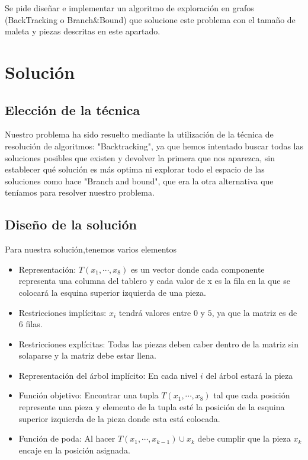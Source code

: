 \documentclass[a4paper, 11pt]{article}
\begin{document}
Se pide diseñar e implementar un algoritmo de exploración en grafos
(BackTracking o Branch\&Bound) que solucione este problema con el tamaño de maleta
y piezas descritas en este apartado.

\section{Solución}




\subsection{Elección de la técnica}
Nuestro problema ha sido resuelto mediante la utilización de la técnica de resolución de algoritmos: "Backtracking", ya que hemos intentado buscar todas las soluciones posibles que existen y devolver la primera que nos aparezca, sin establecer qué solución es más optima ni explorar todo el espacio de las soluciones como hace "Branch and bound", que era la otra alternativa que teníamos para resolver nuestro problema.

\subsection{Diseño de la solución}
Para nuestra solución,tenemos varios elementos
\begin{itemize}
	\item Representación: $T(x_1,\cdots,x_8)$ es un vector donde cada 
componente representa una columna del tablero y cada valor de x es la fila en la que se colocará la esquina superior izquierda de una pieza.
	\item Restricciones implícitas: $x_i$ tendrá valores entre $0$ y $5$, ya que la matriz es de $6$ filas.
	\item Restricciones explícitas: Todas las piezas deben caber dentro de la  matriz sin solaparse y la matriz debe estar llena.
	\item Representación del árbol implícito: En cada nivel $i$ del árbol estará la pieza
	\item Función objetivo: Encontrar una tupla $T(x_1,\cdots, x_8)$ tal que cada posición represente una pieza y elemento de la tupla esté la posición de la esquina superior izquierda de la pieza donde esta está colocada.
	\item Función de poda: Al hacer $T(x_1,\cdots,x_{k-1}) \cup x_k$ debe cumplir que la pieza $x_k$ encaje en la posición asignada.
\end{itemize}
\end{document}
